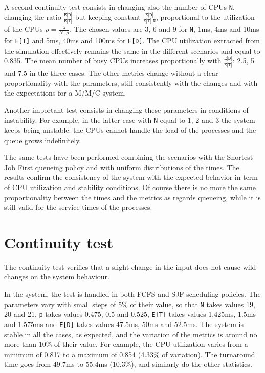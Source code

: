 A second continuity test consists in changing also the number of CPUs \texttt{N},
changing the ratio $\frac{\texttt{E[D]}}{\texttt{E[T]}}$ but keeping constant
$\frac{\texttt{E[D]}}{\texttt{E[T]}\cdot \texttt{N}}$, proportional to the
utilization of the CPUs $\rho=\frac{\lambda}{N\cdot \mu}$. The chosen values
are 3, 6 and 9 for \texttt{N}, 1ms, 4ms and 10ms for \texttt{E[T]} and 
5ms, 40ms and 100ms for \texttt{E[D]}. The CPU utilization extracted from
the simulation effectively remains the same in the different scenarios and equal
to 0.835. The mean number of busy CPUs increases proportionally with
$\frac{\texttt{E[D]}}{\texttt{E[T]}}$: 2.5, 5 and 7.5 in the three cases. The other 
metrics change without a clear proportionality with the parameters, still consistently 
with the changes and with the expectations for a M/M/C system.

Another important test consists in changing these parameters in conditions
of instability. For example, in the latter case with \texttt{N} equal to 1, 2 and 3
the system keeps being unstable: the CPUs cannot handle the load of
the processes and the queue grows indefinitely.

The same tests have been performed combining the scenarios with the Shortest 
Job First queueing policy and with uniform distributions of the times. The results
confirm the consistency of the system with the expected behavior in term of
CPU utilization and stability conditions. Of course there is no more the same
proportionality between the times and the metrics as regards queueing, while it 
is still valid for the service times of the processes.

\section{Continuity test}
The continuity test verifies that a slight change in the input does not 
cause wild changes on the system behaviour.

In the system, the test is handled in both FCFS and SJF scheduling policies.
The parameters vary with small steps of 5\% of their value, so that 
\texttt{N} takes values 19, 20 and 21, \texttt{p} takes values 0.475, 0.5 and 0.525,
\texttt{E[T]} takes values 1.425ms, 1.5ms and 1.575ms and \texttt{E[D]} takes values
47.5ms, 50ms and 52.5ms. The system is stable in all the cases, as expected,
and the variation of the metrics is around no more than 10\% of their value. For
example, the CPU utilization varies from a minimum of 0.817 to a maximum of 0.854 (4.33\% of variation).
The turnaround time goes from 49.7ms to 55.4ms (10.3\%), and similarly do the other
statistics.


